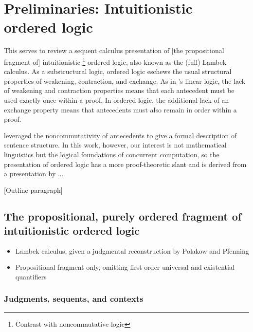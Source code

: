 \chapter{Preliminaries: Intuitionistic ordered logic}\label{ch:ordered-logic}



This  serves to review a sequent calculus presentation of [the propositional fragment of]
intuitionistic%
\footnote{Contrast with noncommutative logic}
ordered logic, also known as the (full) Lambek calculus\autocites{Lambek:AMM58}{Lambek:SLIM61}.
As a substructural logic, ordered logic eschews the usual structural properties of weakening, contraction, and exchange.
As in \citeauthor{Girard:TCS??}'s linear logic\autocite{Girard:TCS??}, the lack of weakening and contraction properties means that each antecedent must be used exactly once within a proof.
In ordered logic, the additional lack of an exchange property means that antecedents must also remain in order within a proof.

 leveraged the noncommutativity of antecedents to give a formal description of sentence structure.
In this work, however, our interest is not mathematical linguistics but the logical foundations of concurrent computation, so the presentation of ordered logic has a more proof-theoretic slant and is derived from a presentation by ...


[Outline paragraph]


\section{The propositional, purely ordered fragment of intuitionistic ordered logic}

\begin{itemize}
\item Lambek calculus, given a judgmental reconstruction by Polakow and Pfenning
\item Propositional fragment only, omitting first-order universal and existential quantifiers
\end{itemize}

\subsection{Judgments, sequents, and contexts}

